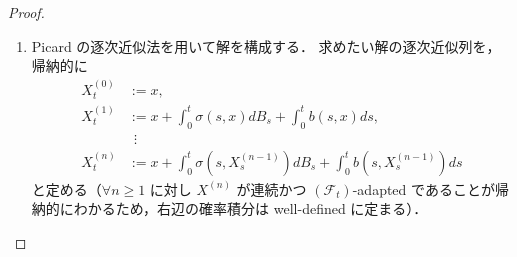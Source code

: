\documentclass{jsarticle}
\begin{document}
\begin{proof}
\begin{enumerate}[label=(\roman*)]
        よって関数 $[0, T]\ni t\mapsto E[(X_{t\wedge\tau_M}-X'_{t\wedge\tau_M})^2]\in[0, \infty)$ を $h$ と定めると，$\forall t\in[0, T]$ に対し
        $$
        h(t)
        \le C\int_0^t h(s)ds.
        $$
        
        ここで $\tau_M$ の定め方から $\left\lvert X_{t\wedge\tau_M}\right\rvert\vee\left\lvert X'_{t\wedge\tau_M}\right\rvert\le M,$ ゆえに $(X_{t\wedge\tau_M})^2, (X'_{t\wedge\tau_M})^2\le M^2$ が言えるので
                \begin{align}
                    h(t)
                    &= E[(X_{t\wedge\tau_M}-X'_{t\wedge\tau_M})^2] \\
                    &\le 2(E[(X_{t\wedge\tau_M})^2]+E[(X'_{t\wedge\tau_M})^2]) \le 4M^2.
                \end{align}
        したがって $h$ は有界なので Lemma \ref{lem:804} が適用でき，$h(t)\le0\cdot e^{Ct}=0$ より $h\equiv0.$
        ゆえに $\forall t\in[0, T]$ に対し
        \begin{align}
            P(X_{t\wedge\tau_M}=X'_{t\wedge\tau_M})=1.
        \end{align}

        一方，
        \begin{align}
            1
            &= P(X_{t\wedge\tau_M}=X'_{t\wedge\tau_M}) \\
            &= P((\{X_t=X'_t\}\cap\{t\le\tau_M\})\cup(\{X_{\tau_M}=X'_{\tau_M}\}\cap\{t>\tau_M\})) \\
            &\le P(X_t=X'_t)+P(t>\tau_M)
            \xrightarrow{M\to\infty}P(X_t=X'_t).
        \end{align}
        \begin{align}
            \therefore 
            \forall t\in[0, T],\quad
            P(X_t=X'_t)=1.
        \end{align}

        $X, X'$ の連続性と $T>0$ の任意性から $P(\forall t\ge0, X_t=X'_t)=1$ が成り立つので，pathwise uniqueness が成り立つことが言えた．
        
        \item
        Picard の逐次近似法を用いて解を構成する．
        求めたい解の逐次近似列を，帰納的に
        \begin{align}
            X_t^{(0)}
            &:= x, \\
            X_t^{(1)}
            &:= x
            + \int_0^t \sigma(s, x)dB_s
            + \int_0^t b(s, x)ds, \\
            &\ \ \vdots \\
            X_t^{(n)}
            &:= x
            + \int_0^t \sigma(s, X_s^{(n-1)})dB_s
            + \int_0^t b(s, X_s^{(n-1)})ds
        \end{align}
        と定める（$\forall n\ge1$ に対し $X^{(n)}$ が連続かつ $(\mathcal{F}_t)$-adapted であることが帰納的にわかるため，右辺の確率積分は well-defined に定まる）．


\end{enumerate}
\end{proof}
\end{document}
